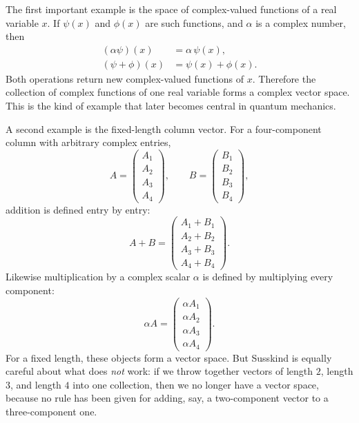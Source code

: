 The first important example is the space of complex-valued functions of a real variable \(x\). If \(\psi(x)\) and \(\phi(x)\) are such functions, and \(\alpha\) is a complex number, then
\begin{align}
(\alpha \psi)(x) &= \alpha\,\psi(x),\\
(\psi+\phi)(x) &= \psi(x)+\phi(x).
\end{align}
Both operations return new complex-valued functions of \(x\). Therefore the collection of complex functions of one real variable forms a complex vector space. This is the kind of example that later becomes central in quantum mechanics.

A second example is the fixed-length column vector. For a four-component column with arbitrary complex entries,
\begin{equation}
A=
\begin{pmatrix}
A_1\\
A_2\\
A_3\\
A_4
\end{pmatrix},
\qquad
B=
\begin{pmatrix}
B_1\\
B_2\\
B_3\\
B_4
\end{pmatrix},
\end{equation}
addition is defined entry by entry:
\begin{equation}
A+B=
\begin{pmatrix}
A_1+B_1\\
A_2+B_2\\
A_3+B_3\\
A_4+B_4
\end{pmatrix}.
\end{equation}
Likewise multiplication by a complex scalar \(\alpha\) is defined by multiplying every component:
\begin{equation}
\alpha A=
\begin{pmatrix}
\alpha A_1\\
\alpha A_2\\
\alpha A_3\\
\alpha A_4
\end{pmatrix}.
\end{equation}
For a fixed length, these objects form a vector space. But Susskind is equally careful about what does \emph{not} work: if we throw together vectors of length \(2\), length \(3\), and length \(4\) into one collection, then we no longer have a vector space, because no rule has been given for adding, say, a two-component vector to a three-component one.

